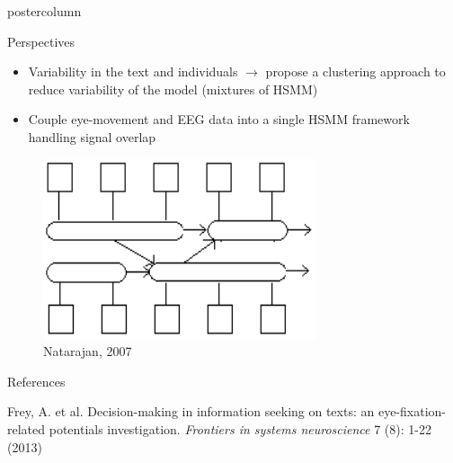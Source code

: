 \documentclass[final,hyperref={pdfpagelabels=false}]{beamer}
\begin{document}
\begin{frame}
\begin{columns}
\begin{column}{.50\textwidth}
\begin{beamercolorbox}[center,wd=\textwidth]{postercolumn}
\begin{minipage}[T]{.98\textwidth}
{            %

            \vfill
            \begin{block}{Perspectives}
                \vskip0.2cm
                \begin{minipage}{0.67\textwidth}
                    \begin{itemize}
                        \item[\bullet] Variability in the text and individuals $\rightarrow$ propose a clustering approach to reduce variability of the model (mixtures of HSMM)
                        \item[\bullet] Couple eye-movement and EEG data into a single HSMM framework handling signal overlap
                    \end{itemize}
                \end{minipage}
                \begin{minipage}{0.30\textwidth}
                    \begin{figure}[h]
                        \centering
                        \includegraphics[heigth=10cm]{chsmm_representation.png}
                        \caption{Natarajan, 2007}
                    \end{figure}
                \end{minipage}


            \end{block}

            \vfill
            \begin{block}{References}
                \begin{enumerate}
                    {\footnotesize
                    \item Frey, A. et al.
                    Decision-making in information seeking on texts: an eye-fixation-related potentials investigation.
                    \textit{Frontiers in systems neuroscience} 7 (8): 1-22 (2013)

}
\end{enumerate}
\end{block}}
\end{minipage}
\end{beamercolorbox}
\end{column}
\end{columns}
\end{frame}
\end{document}
